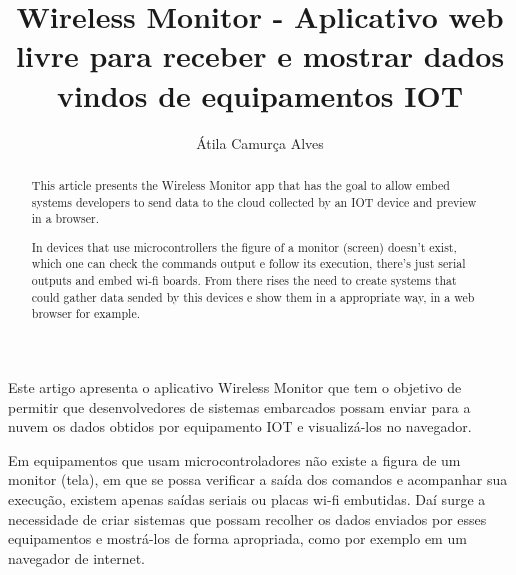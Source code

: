 \documentclass[a4paper,12pt]{article}
\title{Wireless Monitor - Aplicativo web livre para receber e mostrar dados vindos de equipamentos IOT}
\author{Átila Camurça Alves\inst{1}}
\newcommand{\wm}{Wireless Monitor\xspace}
\begin{document}
\maketitle

\begin{abstract}
This article presents the \wm app that has the goal to allow
embed systems developers to send data to the cloud collected by
an IOT device and preview in a browser.

In devices that use microcontrollers the figure of a monitor (screen)
doesn't exist, which one can check the commands output e follow
its execution, there's just serial outputs and embed wi-fi boards.
From there rises the need to create systems that could gather data
sended by this devices e show them in a appropriate way, in a web browser
for example.
\end{abstract}
     
\begin{resumo}
Este artigo apresenta o aplicativo \wm que tem o objetivo de permitir que
desenvolvedores de sistemas embarcados possam enviar para a nuvem
os dados obtidos por equipamento IOT e visualizá-los no navegador.

Em equipamentos que usam microcontroladores não existe a figura de
um monitor (tela), em que se possa verificar a saída dos comandos e acompanhar
sua execução, existem apenas saídas seriais ou placas wi-fi embutidas.
Daí surge a necessidade de criar sistemas que possam recolher os dados
enviados por esses equipamentos e mostrá-los de forma apropriada, como por exemplo
em um navegador de internet.
\end{resumo}





\end{document}
